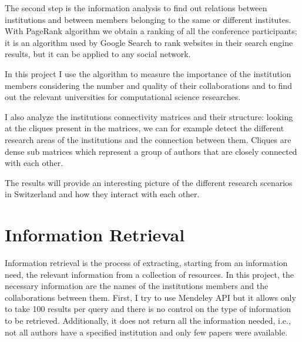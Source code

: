 \documentclass[]{usiinfbachelorproject}
\begin{document}
The second step is the information analysis to find out relations between institutions and between members belonging to the same or different institutes. With PageRank algorithm we obtain a ranking of all the conference participants; it is an algorithm used by Google Search to rank websites in their search engine results, but it can be applied to any social network. 

In this project I use the algorithm to measure the importance of the institution members considering the number and quality of their collaborations and to find out the relevant universities for computational science researches. 


I also analyze the institutions connectivity matrices and their structure: looking at the cliques present in the matrices, we can for example detect the different research areas of the institutions and the connection between them. Cliques are dense sub matrices which represent a group of authors that are closely connected with each other. 

The results will provide an interesting picture of the different research scenarios in Switzerland and how they interact with each other.






\section{Information Retrieval} \label{sec:inforetrieval} 

Information retrieval is the process of extracting, starting from an information need, the relevant information from a collection of resources. In this project, the necessary information are the names of the institutions members and the collaborations between them. 
First, I try to use Mendeley API but it allows only to take 100 results per query and there is no control on the type of information to be retrieved. Additionally, it does not return all the information needed, i.e., not all authors have a specified institution and only few papers were available.
\end{document}
